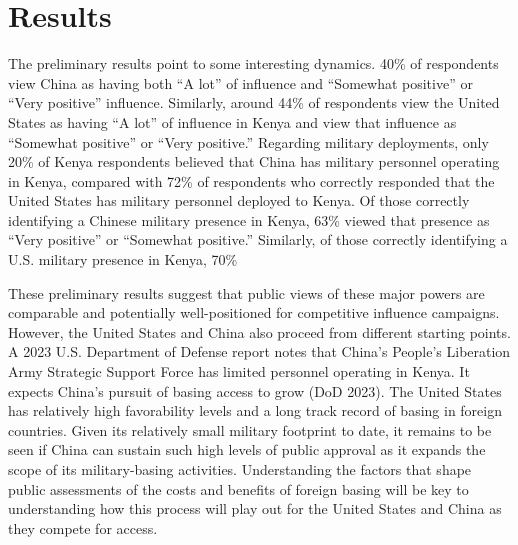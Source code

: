 \section*{Results}


The preliminary results point to some interesting dynamics. 40\% of respondents view China as having both ``A lot'' of influence and ``Somewhat positive'' or ``Very positive'' influence. Similarly, around 44\% of respondents view the United States as having ``A lot'' of influence in Kenya and view that influence as ``Somewhat positive'' or ``Very positive.'' Regarding military deployments, only 20\% of Kenya respondents believed that China has military personnel operating in Kenya, compared with 72\% of respondents who correctly responded that the United States has military personnel deployed to Kenya. Of those correctly identifying a Chinese military presence in Kenya, 63\% viewed that presence as ``Very positive'' or ``Somewhat positive.'' Similarly, of those correctly identifying a U.S. military presence in Kenya, 70\% %




These preliminary results suggest that public views of these major powers are comparable and potentially well-positioned for competitive influence campaigns. However, the United States and China also proceed from different starting points. A 2023 U.S. Department of Defense report notes that China's People's Liberation Army Strategic Support Force has limited personnel operating in Kenya. It expects China's pursuit of basing access to grow (DoD 2023). The United States has relatively high favorability levels and a long track record of basing in foreign countries. Given its relatively small military footprint to date, it remains to be seen if China can sustain such high levels of public approval as it expands the scope of its military-basing activities. Understanding the factors that shape public assessments of the costs and benefits of foreign basing will be key to understanding how this process will play out for the United States and China as they compete for access.


